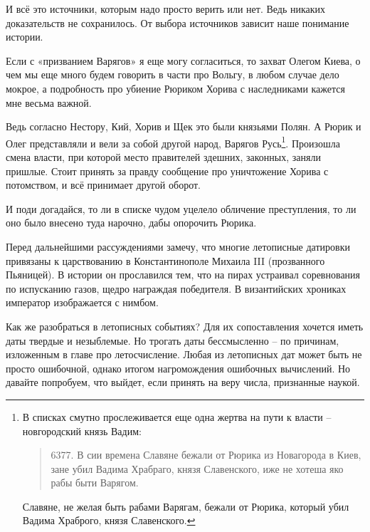 
И всё это источники, которым надо просто верить или нет. Ведь никаких доказательств не сохранилось. От выбора источников зависит наше понимание истории.

Если с «призванием Варягов» я еще могу согласиться, то захват Олегом Киева, о чем мы еще много будем говорить в части про Вольгу, в любом случае дело мокрое, а подробность про убиение Рюриком Хорива с наследниками кажется мне весьма важной. 

Ведь согласно Нестору, Кий, Хорив и Щек это были князьями Полян. А Рюрик и Олег представляли и вели за собой другой народ, Варягов Русь\footnote{В списках смутно прослеживается еще одна жертва на пути к власти – новгородский князь Вадим: 

\begin{quotation}
6377. В сии времена Славяне бежали от Рюрика из Новагорода в Киев, зане убил Вадима Храбраго, князя Славенского, иже не хотеша яко рабы быти Варягом.
\end{quotation}

Славяне, не желая быть рабами Варягам, бежали от Рюрика, который убил Вадима Храброго, князя Славенского.}. Произошла смена власти, при которой место правителей здешних, законных, заняли пришлые. Стоит принять за правду сообщение про уничтожение Хорива с потомством, и всё принимает другой оборот.

И поди догадайся, то ли в списке чудом уцелело обличение преступления, то ли оно было внесено туда нарочно, дабы опорочить Рюрика.

Перед дальнейшими рассуждениями замечу, что многие летописные датировки привязаны к царствованию в Константинополе Михаила III (прозванного Пьяницей). В истории он прославился тем, что на пирах устраивал соревнования по испусканию газов, щедро награждая победителя. В византийских хрониках император изображается с нимбом.

Как же разобраться в летописных событиях? Для их сопоставления хочется иметь даты твердые и незыблемые. Но трогать даты бессмысленно – по причинам, изложенным в главе про летосчисление. Любая из летописных дат может быть не просто ошибочной, однако итогом нагромождения ошибочных вычислений. Но давайте попробуем, что выйдет, если принять на веру числа, признанные наукой.

